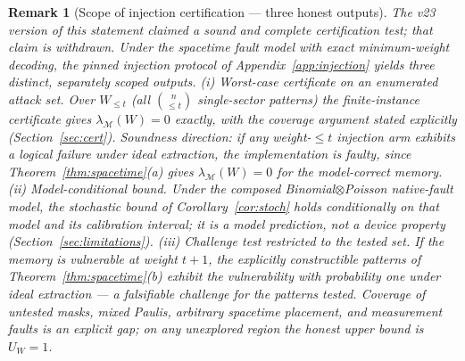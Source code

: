 \documentclass[11pt,a4paper]{article}
\newtheorem{remark}{Remark}
\begin{document}
\begin{remark}[Scope of injection certification --- three honest outputs]
\label{cor:inj-cert}
The v23 version of this statement claimed a \emph{sound and complete}
certification test; that claim is withdrawn. Under the spacetime fault
model with exact minimum-weight decoding, the pinned injection protocol
of Appendix~\ref{app:injection} yields three distinct, separately
scoped outputs.
\emph{(i) Worst-case certificate on an enumerated attack set.} Over
$W_{\le t}$ (all $\binom{n}{\le t}$ single-sector patterns) the
finite-instance certificate gives $\lambda_{\mathcal{M}}(W)=0$ exactly,
with the coverage argument stated explicitly
(Section~\ref{sec:cert}). Soundness direction: if any weight-$\le t$
injection arm exhibits a logical failure under ideal extraction, the
implementation is faulty, since Theorem~\ref{thm:spacetime}(a) gives
$\lambda_{\mathcal{M}}(W)=0$ for the model-correct memory.
\emph{(ii) Model-conditional bound.} Under the composed
Binomial$\otimes$Poisson native-fault model, the stochastic bound of
Corollary~\ref{cor:stoch} holds conditionally on that model and its
calibration interval; it is a model prediction, not a device property
(Section~\ref{sec:limitations}).
\emph{(iii) Challenge test restricted to the tested set.} If the memory
is vulnerable at weight $t{+}1$, the explicitly constructible patterns
of Theorem~\ref{thm:spacetime}(b) exhibit the vulnerability with
probability one under ideal extraction --- a falsifiable challenge for
the patterns tested. Coverage of untested masks, mixed Paulis,
arbitrary spacetime placement, and measurement faults is an explicit
gap; on any unexplored region the honest upper bound is $U_W=1$.
\end{remark}
\end{document}
